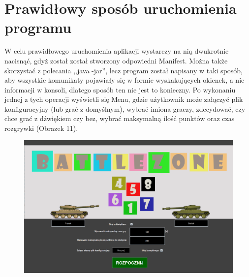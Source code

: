 \documentclass{article}
\begin{document}
\section{Prawidłowy sposób uruchomienia programu}
W celu prawidłowego uruchomienia aplikacji wystarczy na nią dwukrotnie nacisnąć, gdyż został został stworzony odpowiedni Manifest. Można także skorzystać z polecania ,,java -jar'', lecz program został napisany w taki sposób, aby wszystkie komunikaty pojawiały się w formie wyskakujących okienek, a nie informacji w konsoli, dlatego sposób ten nie jest to konieczny.
Po wykonaniu jednej z tych operacji wyświetli się Menu, gdzie użytkownik może załączyć plik konfiguracyjny (lub grać z domyślnym), wybrać imiona graczy, zdecydować, czy chce grać z dźwiękiem czy bez, wybrać maksymalną ilość punktów oraz czas rozgrywki (Obrazek 11).

\begin{figure} [hbt!]
    \centering
    \includegraphics[width=12cm]{menu_panel.png}
\end{figure}
\end{document}

